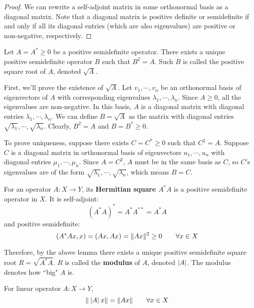 \begin{proof}
We can rewrite a self-adjoint matrix in some orthonormal basis as a diagonal matrix. Note that a diagonal matrix is positive definite or semidefinite if and only if all its diagonal entries (which are also eigenvalues) are positive or non-negative, respectively.  
\end{proof}

\begin{lemma}
Let $A = A^{*} \geq 0$ be a positive semidefinite operator. There exists a unique positive semidefinite operator $B$ such that $B^{2} = A$. Such $B$ is called the positive square root of $A$, denoted $\sqrt{A}$.
\end{lemma}

\begin{lproof}
First, we'll prove the existence of $\sqrt{A}$. Let $v_{1}, \cdots, v_{n}$ be an orthonormal basis of eigenvectors of $A$ with corresponding eigenvalues $\lambda_{1}, \cdots, \lambda_{n}$. Since $A \geq 0$, all the eigenvalues are non-negative. In this basis, $A$ is a diagonal matrix with diagonal entries $\lambda_{1}, \cdots, \lambda_{n}$. We can define $B =\sqrt{A}$ as the matrix with diagonal entries $\sqrt{\lambda_{1}}, \cdots, \sqrt{\lambda_{n}}$. Clearly, $B^{2} = A$ and $B = B^{*} \geq 0$. 

To prove uniqueness, suppose there exists $C = C^{*} \geq 0$ such that $C^{2} = A$. Suppose $C$ is a diagonal matrix in orthonormal basis of eigenvectors $u_{1}, \cdots, u_{n}$ with diagonal entries $\mu_{1}, \cdots, \mu_{n}$. Since $A = C^{2}$, $A$ must be in the same basis as $C$, so $C$'s eigenvalues are of the form $\sqrt{\lambda_{1}}, \cdots, \sqrt{\lambda_{n}}$, which means $B = C$. 
\end{lproof}

\begin{definition}
For an operator $A: X \rightarrow Y$, its \textbf{Hermitian square $A^{*} A$} is a positive semidefinite operator in $X$. It is self-adjoint:
$$(A^{*} A)^{*} = A^{*} A^{**} = A^{*} A$$
and positive semidefinite:
$$(A^{*} Ax, x) = (Ax, Ax) = \lVert Ax\rVert^{2} \geq 0 \qquad \forall x \in X$$

Therefore, by the above lemma there exists a unique positive semidefinite square root $R = \sqrt{A^{*} A}$. $R$ is called the \textbf{modulus} of $A$, denoted $\lvert A\rvert$. The modulus denotes how ``big" $A$ is. 
\end{definition}

\begin{lemma}
For linear operator $A: X \rightarrow Y$, 
$$\lVert\: \lvert A\rvert \: x\rVert = \lVert Ax\rVert \qquad \forall x \in X$$ 
\end{lemma}

